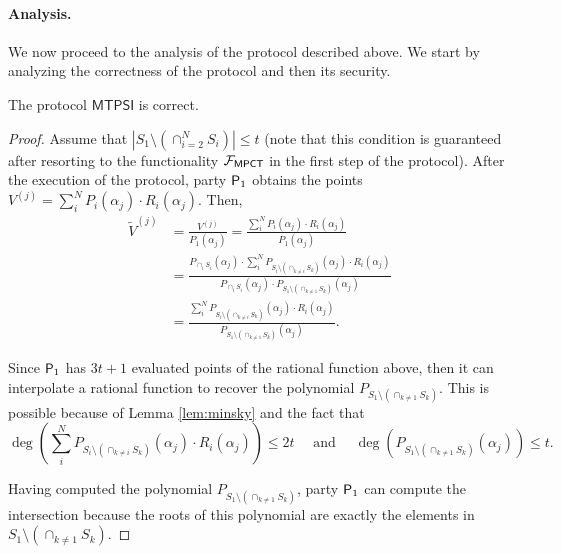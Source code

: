 \paragraph{Analysis.} We now proceed to the analysis of the protocol described above. We start by analyzing the correctness of the protocol and then its security.

\begin{theorem}[Correctness]
\label{theor:MPPSIcorrect}
The protocol $\mathsf{MTPSI}$ is correct.
\end{theorem}{}
\begin{proof}
Assume that $|S_1\setminus \left(\cap_{i=2}^N S_i\right)|\leq t$ (note that this condition is guaranteed after resorting to the functionality $\mathcal{F}_{\mathsf{MPCT}}$ in the first step of the protocol). After the execution of the protocol, party $\mathsf{P}_1$ obtains the points $V^{(j)}=\sum_i^{N} P_i(\alpha_j)\cdot R_i(\alpha_j)$. Then, \begin{align*}
    \tilde{V}^ {(j)} & =\frac{V^{(j)}}{P_1(\alpha_j)} =\frac{\sum_i^{N} P_i(\alpha_j)\cdot R_i(\alpha_j)}{P_1(\alpha_j)} \\
     &=\frac{P_{\cap_i S_i}(\alpha_j)\cdot\sum_i^{N} P_{S_i\setminus \left(\cap_{k\neq i} S_k\right)}(\alpha_j)\cdot R_i(\alpha_j)}{P_{\cap_i S_i}(\alpha_j)\cdot P_{S_1\setminus \left(\cap_{k\neq 1} S_k\right)}(\alpha_j)}  \\
      &=\frac{\sum_i^{N} P_{S_i\setminus \left(\cap_{k\neq i} S_k\right)}(\alpha_j)\cdot R_i(\alpha_j)}{ P_{S_1\setminus \left(\cap_{k\neq 1} S_k\right)}(\alpha_j)}  .
\end{align*}{}

Since $\mathsf{P}_1$ has $3t+1$ evaluated points of the rational function above, then it can interpolate a rational function to recover the polynomial $P_{S_1\setminus \left(\cap_{k\neq 1} S_k\right)}$. This is possible because of Lemma \ref{lem:minsky} and the fact that $$\deg \left(\sum_i^{N} P_{S_i\setminus \left(\cap_{k\neq i} S_k\right)}(\alpha_j)\cdot R_i(\alpha_j) \right)\leq 2t \quad \text{ and } \quad \deg\left( P_{S_1\setminus \left(\cap_{k\neq 1} S_k\right)}(\alpha_j)\right)\leq t.$$ 

Having computed the polynomial $P_{S_1\setminus \left(\cap_{k\neq 1} S_k\right)}$, party $\mathsf{P}_1$ can compute the intersection because the roots of this polynomial are exactly the elements in $S_1\setminus \left(\cap_{k\neq 1} S_k\right)$.
\end{proof}{}

